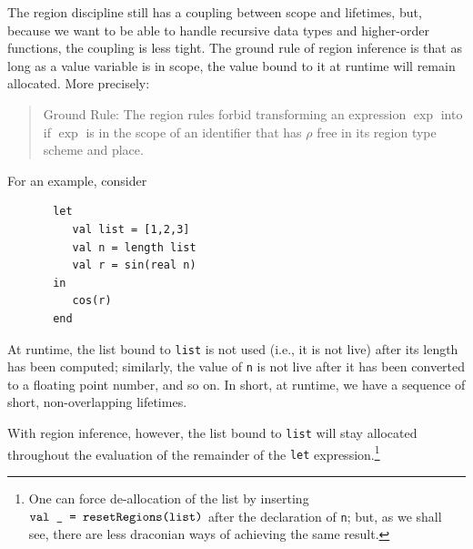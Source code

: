 \documentclass[12pt]{book}
\begin{document}
The region discipline still has a coupling between scope and lifetimes,
but, because we want to be able to handle recursive data types and higher-order
functions, the coupling is less tight. 
The ground rule of region inference
%
%
is that as long as a value variable is in scope, the value bound to it
at runtime will remain allocated. More precisely:
\begin{quote}
       Ground Rule: The region rules forbid transforming an expression
       $\exp$ into  if $\exp$ is
       in the scope of an identifier that has $\rho$ free in its region type
       scheme and place.
\end{quote}
For an example, consider
\begin{verbatim}
       let 
          val list = [1,2,3]
          val n = length list
          val r = sin(real n)
       in
          cos(r)
       end
\end{verbatim} 
At runtime, the list bound to {\tt list} is not used (i.e., it is not live) 
after its length has been computed;
similarly, the value of {\tt n} is not live after it has been converted to a floating point
number, and so on. In short, at runtime, we have a sequence of short, non-overlapping
lifetimes. 

With region inference, however, the list bound to {\tt list} will stay allocated
throughout the evaluation of the remainder of the {\tt let} expression.\footnote{One can
force de-allocation of the list by  inserting 
$\hbox{\tt val \_ = \hbox{\tt resetRegions}(list)}$ after the declaration of {\tt n}; but, as we shall see,
there are less draconian ways of achieving the same result.} 
\end{document}
